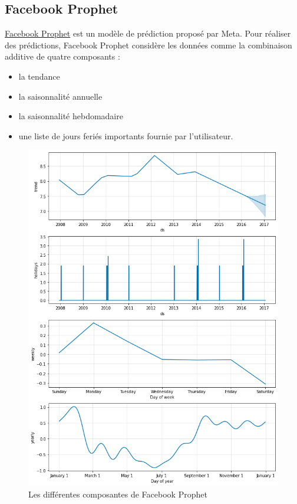 \documentclass[french]{article}
\begin{document}
    \subsection{Facebook Prophet}

    \href{https://facebook.github.io/prophet/}{Facebook Prophet} est un modèle de prédiction proposé par Meta. 
    Pour réaliser des prédictions, Facebook Prophet considère les données comme la combinaison additive de quatre composants\cite{meta} : 
    \begin{itemize}
        \item la tendance
        \item la saisonnalité annuelle
        \item la saisonnalité hebdomadaire
        \item une liste de jours feriés importants fournie par l'utilisateur.
    \end{itemize}
    \begin{figure}[h]
        \includegraphics[width=12cm]{facebook_prophet}
        \centering
        \caption{Les différentes composantes de Facebook Prophet}
        \centering
    \end{figure}
\end{document}
